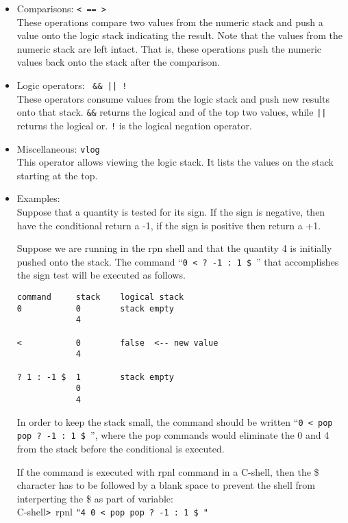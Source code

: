 \begin{itemize}
\begin{itemize}
\begin{itemize}
\item Comparisons: {\tt < == > }\\
These operations compare two values from the numeric stack and push a value onto the logic stack indicating the result.
Note that the values from the numeric stack are left intact.  That is, these operations push the numeric values back onto the
stack after the comparison.
\item Logic operators: \verb. && || !.\\
These operators consume values from the logic stack and push new results onto that stack.
\verb|&&| returns the logical and of the top two values, while {\tt ||} returns the logical or.
{\tt !} is the logical negation operator.
\item Miscellaneous: {\tt vlog}\\
This operator allows viewing the logic stack.  It lists the values on the stack starting at the top.

\item Examples:\\
Suppose that a quantity is tested for its sign.  If the sign is negative, then have the conditional return a -1, if the sign is positive then return a +1.

Suppose we are running in the rpn shell and that the quantity 4 is initially pushed onto the stack.  The command ``\verb.0 < ? -1 : 1 $.\ '' that accomplishes the sign test will be executed as follows.
\begin{flushleft}
\begin{verbatim}
command     stack    logical stack
0           0        stack empty
            4

<           0        false  <-- new value
            4

? 1 : -1 $  1        stack empty
            0  
            4
\end{verbatim}
\end{flushleft}
In order to keep the stack small, the command should be written ``\verb.0 < pop pop ? -1 : 1 $.\ '', where the pop commands would eliminate the 0 and 4 from the stack before the conditional is executed.

If the command is executed with rpnl command in a C-shell, then the \$
character has to be followed by a blank space to prevent the shell
from interperting the \$ as part of variable:\\

C-shell\verb.>.\ rpnl \verb."4 0 < pop pop ? -1 : 1 $ ".\\


\end{itemize}
\end{itemize}
\end{itemize}
